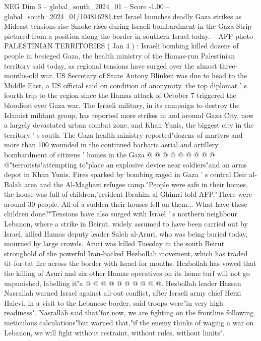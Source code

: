 \begin{textsample}{NEG Dim 3 – global\_south\_2024\_01 – Score -1.00 – global\_south\_2024\_01/104816281.txt}  \label{ex:f3_neg_071}
Israel launches deadly Gaza strikes as Mideast tensions rise Smoke rises during Israeli bombardment in the Gaza Strip pictured from a position along the border in southern Israel today. -- AFP photo PALESTINIAN TERRITORIES ( Jan 4 ) : Israeli bombing killed dozens of people in besieged Gaza, the health ministry of the Hamas-run Palestinian territory said today, as regional tensions have surged over the almost three-months-old war.
US Secretary of State Antony Blinken was due to head to the Middle East, a US official said on condition of anonymity, the top diplomat ' s fourth trip to the region since the Hamas attack of October 7 triggered the bloodiest ever Gaza war.
The Israeli military, in its campaign to destroy the Islamist militant group, has reported more strikes in and around Gaza City, now a largely devastated urban combat zone, and Khan Yunis, the biggest city in the territory ' s south.
The Gaza health ministry reported"dozens of martyrs and more than 100 wounded in the continued barbaric aerial and artillery bombardment of citizens ' homes in the Gaza @ @ @ @ @ @ @ @ @ @"terrorists"attempting to"place an explosive device near soldiers"and an arms depot in Khan Yunis.
Fires sparked by bombing raged in Gaza ' s central Deir al-Balah area and the Al-Maghazi refugee camp."People were safe in their homes, the house was full of children,"resident Ibrahim al-Ghimri told AFP."There were around 30 people.
All of a sudden their houses fell on them...
What have these children done?"Tensions have also surged with Israel ' s northern neighbour Lebanon, where a strike in Beirut, widely assumed to have been carried out by Israel, killed Hamas deputy leader Saleh al-Aruri, who was being buried today, mourned by large crowds.
Aruri was killed Tuesday in the south Beirut stronghold of the powerful Iran-backed Hezbollah movement, which has traded tit-for-tat fire across the border with Israel for months.
Hezbollah has vowed that the killing of Aruri and six other Hamas operatives on its home turf will not go unpunished, labelling it"a @ @ @ @ @ @ @ @ @ @.
Hezbollah leader Hassan Nasrallah warned Israel against all-out conflict, after Israeli army chief Herzi Halevi, in a visit to the Lebanese border, said troops were"in very high readiness".
Nasrallah said that"for now, we are fighting on the frontline following meticulous calculations"but warned that,"if the enemy thinks of waging a war on Lebanon, we will fight without restraint, without rules, without limits".

\end{textsample}
